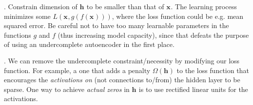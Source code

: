 \documentclass[11pt]{article}
\renewcommand\vec[2][]{\bm{#2}_{#1}}
\newcommand\myspace[1][]{\vspace{#1\bigskipamount}}
\newcommand\p{\Needspace{10\baselineskip} \noindent}
\begin{document}
\myspace
\p {}. Constrain dimension of $\vec{h}$ to be smaller than that of $\vec{x}$. The learning process minimizes some $L(\vec{x}, g(f(\vec{x})))$, where the loss function could be e.g. mean squared error. Be careful not to have too many learnable parameters in the functions $g$ and $f$ (thus increasing model capacity), since that defeats the purpose of using an undercomplete autoencoder in the first place.

\myspace
\p {}. We can remove the undercomplete constraint/necessity by modifying our loss function. For example, a  one that adds a penalty $\Omega(\vec{h})$ to the loss function that encourages the \textit{activations on} (not connections to/from) the hidden layer to be sparse. One way to achieve \textit{actual zeros} in $\vec{h}$ is to use rectified linear units for the activations.


%
% 
\end{document}
